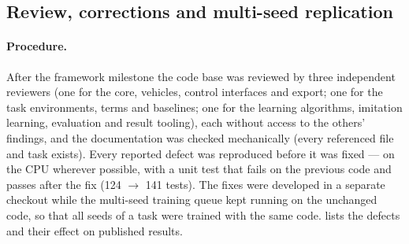 \subsection{Review, corrections and multi-seed replication}\label{sec:review}
\paragraph{Procedure.} After the framework milestone the code base was reviewed by three independent reviewers (one
for the core, vehicles, control interfaces and export; one for the task environments, terms and baselines; one for
the learning algorithms, imitation learning, evaluation and result tooling), each without access to the others'
findings, and the documentation was checked mechanically (every referenced file and task exists). Every reported
defect was reproduced before it was fixed --- on the CPU wherever possible, with a unit test that fails on the previous
code and passes after the fix (124 $\to$ 141 tests). The fixes were developed in a separate checkout while the
multi-seed training queue kept running on the unchanged code, so that all seeds of a task were trained with the same
code.  lists the defects and their effect on published results.


